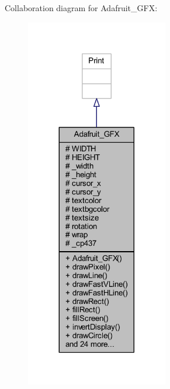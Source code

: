 Collaboration diagram for Adafruit\+\_\+\+G\+FX\+:
\nopagebreak
\begin{figure}[H]
\begin{center}
\leavevmode
\includegraphics[width=176pt]{d2/d7c/class_adafruit___g_f_x__coll__graph}
\end{center}
\end{figure}
